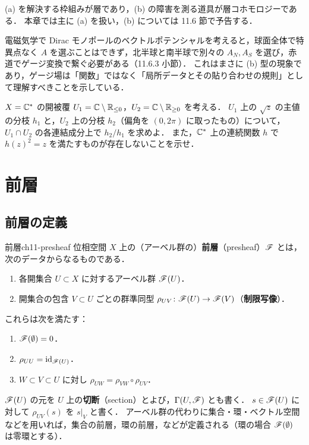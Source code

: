 (a) を解決する枠組みが層であり，(b) の障害を測る道具が層コホモロジーである．
本章では主に (a) を扱い，(b) については 11.6 節で予告する．

\begin{physbox}[パッチと大域的な場]
電磁気学で Dirac モノポールのベクトルポテンシャルを考えると，球面全体で特異点なく $A$ を選ぶことはできず，北半球と南半球で別々の $A_N,A_S$ を選び，赤道でゲージ変換で繋ぐ必要がある（11.6.3 小節）．
これはまさに (b) 型の現象であり，ゲージ場は「関数」ではなく「局所データとその貼り合わせの規則」として理解すべきことを示している．
\end{physbox}

$X=\mathbb{C}^*$ の開被覆 $U_1=\mathbb{C}\setminus\mathbb{R}_{\le0}$，$U_2=\mathbb{C}\setminus\mathbb{R}_{\ge0}$ を考える．
$U_1$ 上の $\sqrt{z}$ の主値の分枝 $h_1$ と，$U_2$ 上の分枝 $h_2$（偏角を $(0,2\pi)$ に取ったもの）について，$U_1\cap U_2$ の各連結成分上で $h_2/h_1$ を求めよ．
また，$\mathbb{C}^*$ 上の連続関数 $h$ で $h(z)^2=z$ を満たすものが存在しないことを示せ．

\section{前層}

\subsection{前層の定義}

\begin{mydef}{前層}{ch11-presheaf}
位相空間 $X$ 上の（アーベル群の）\textbf{前層}（presheaf）$\mathscr{F}$ とは，次のデータからなるものである．
\begin{enumerate}
  \item 各開集合 $U\subset X$ に対するアーベル群 $\mathscr{F}(U)$．
  \item 開集合の包含 $V\subset U$ ごとの群準同型 $\rho_{UV}\colon \mathscr{F}(U)\to\mathscr{F}(V)$（\textbf{制限写像}）．
\end{enumerate}
これらは次を満たす：
\begin{enumerate}
  \item[(P0)] $\mathscr{F}(\emptyset)=0$．
  \item[(P1)] $\rho_{UU}=\mathrm{id}_{\mathscr{F}(U)}$．
  \item[(P2)] $W\subset V\subset U$ に対し $\rho_{UW}=\rho_{VW}\circ\rho_{UV}$．
\end{enumerate}
$\mathscr{F}(U)$ の元を $U$ 上の\textbf{切断}（section）とよび，$\Gamma(U,\mathscr{F})$ とも書く．
$s\in\mathscr{F}(U)$ に対して $\rho_{UV}(s)$ を $s|_V$ と書く．
アーベル群の代わりに集合・環・ベクトル空間などを用いれば，集合の前層，環の前層，などが定義される（環の場合 $\mathscr{F}(\emptyset)$ は零環とする）．
\end{mydef}

